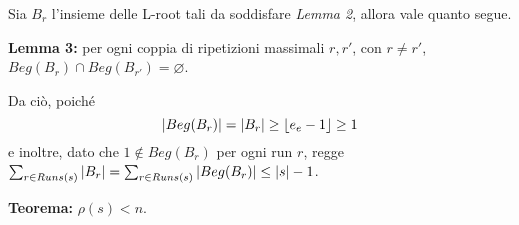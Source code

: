 \documentclass{beamer}
\begin{document}
   \begin{frame}
       Sia \(B_{r}\) l'insieme delle L-root tali da soddisfare \emph{Lemma 2},
       allora vale quanto segue.

       \textbf{Lemma 3: } per ogni coppia di ripetizioni massimali \(r, r'\), 
       con \(r \ne r'\), \(Beg(B_{r}) \cap Beg(B_{r'}) = \varnothing\).

       Da ciò, poiché 
       \[
           \left\lvert Beg(B_{r}) \right\rvert = \left\lvert B_{r} \right\rvert \ge \left\lfloor e_{e} - 1 \right\rfloor \ge 1
       \]
       e inoltre, dato che \(1 \notin Beg(B_{r})\) per ogni run \(r\), regge
       \(\sum_{r \in Runs(s)}{\left\lvert B_{r} \right\rvert} = \sum_{r \in Runs(s)}{\left\lvert Beg(B_{r}) \right\rvert}
       \le \left\lvert s \right\rvert - 1\).

       \textbf{Teorema: } \(\rho(s) < n\).
   \end{frame}
\end{document}
